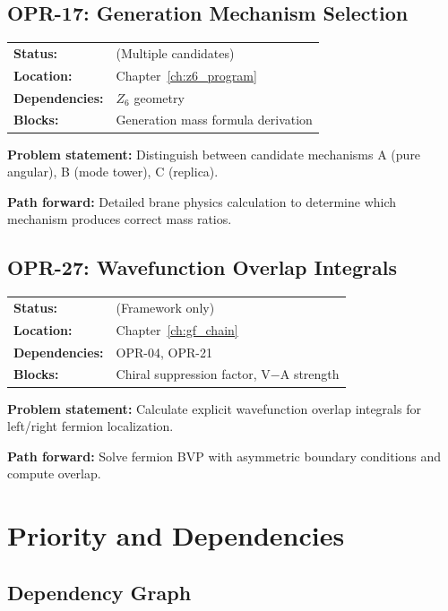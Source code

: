 \subsection*{OPR-17: Generation Mechanism Selection}
\begin{tabular}{ll}
\textbf{Status:} & \tagOpen{} (Multiple candidates) \\
\textbf{Location:} & Chapter~\ref{ch:z6_program} \\
\textbf{Dependencies:} & $Z_6$ geometry \\
\textbf{Blocks:} & Generation mass formula derivation \\
\end{tabular}

\textbf{Problem statement:} Distinguish between candidate mechanisms
A (pure angular), B (mode tower), C (replica).

\textbf{Path forward:} Detailed brane physics calculation to determine
which mechanism produces correct mass ratios.

\bigskip

\subsection*{OPR-27: Wavefunction Overlap Integrals}
\begin{tabular}{ll}
\textbf{Status:} & \tagOpen{} (Framework only) \\
\textbf{Location:} & Chapter~\ref{ch:gf_chain} \\
\textbf{Dependencies:} & OPR-04, OPR-21 \\
\textbf{Blocks:} & Chiral suppression factor, V$-$A strength \\
\end{tabular}

\textbf{Problem statement:} Calculate explicit wavefunction overlap
integrals for left/right fermion localization.

\textbf{Path forward:} Solve fermion BVP with asymmetric boundary
conditions and compute overlap.

\section{Priority and Dependencies}

\subsection*{Dependency Graph}

